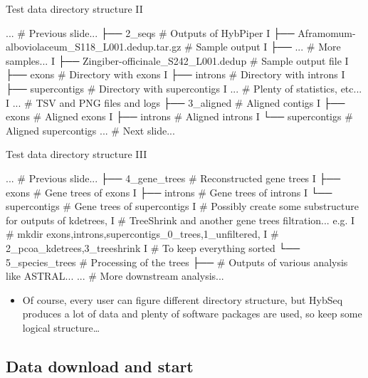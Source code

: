 \documentclass[compress,  xelatex, 11pt, xcolor=x11names, aspectratio=169,
	hyperref={
		bookmarks=true,
		unicode=true,
		colorlinks=true,
		pdftitle={HybSeq course},
		plainpages=false,
		pdfauthor={Vojtech Zeisek},
		pdfsubject={Practical processing of HybSeq target enrichment sequencing data on computing grids like MetaCentrum},
		pdfcreator={XeLaTeX},
		pdfkeywords={BASH, command line, GNU, HybSeq, Linux, MetaCentrum, sequencing shell, target enrichment},
		linkcolor=Turquoise4, %
		anchorcolor=DodgerBlue4, %
		citecolor=DodgerBlue4, %
		filecolor=DodgerBlue4, %
		menucolor=Tan4, %
		urlcolor=DarkOliveGreen4 %
		},
	url={hyphens, lowtilde} %
	]{beamer}
\begin{document}
\begin{frame}[fragile]{Test data directory structure II}
	\begin{bashcode}
        ... # Previous slide...
        ├── 2_seqs # Outputs of HybPiper
        I   ├── Aframomum-alboviolaceum_S118_L001.dedup.tar.gz # Sample output
        I   ├── ... # More samples...
        I   ├── Zingiber-officinale_S242_L001.dedup # Sample output file
        I   ├── exons # Directory with exons
        I   ├── introns # Directory with introns
        I   ├── supercontigs # Directory with supercontigs
        I   ... # Plenty of statistics, etc...
        I   ... # TSV and PNG files and logs
        ├── 3_aligned # Aligned contigs
        I   ├── exons # Aligned exons
        I   ├── introns # Aligned introns
        I   └── supercontigs # Aligned supercontigs
        ... # Next slide...
	\end{bashcode}
\end{frame}

\begin{frame}[fragile]{Test data directory structure III}
	\begin{bashcode}
        ... # Previous slide...
        ├── 4_gene_trees # Reconstructed gene trees
        I   ├── exons # Gene trees of exons
        I   ├── introns # Gene trees of introns
        I   └── supercontigs # Gene trees of supercontigs
        I   # Possibly create some substructure for outputs of kdetrees,
        I   # TreeShrink and another gene trees filtration... e.g.
        I   # mkdir {exons,introns,supercontigs}_{0_trees,1_unfiltered,
        I   #   2_pcoa_kdetrees,3_treeshrink}
        I   # To keep everything sorted
        └── 5_species_trees # Processing of the trees
            ├── # Outputs of various analysis like ASTRAL...
            ... # More downstream analysis...
	\end{bashcode}
	\begin{itemize}
		\item Of course, every user can figure different directory structure, but HybSeq produces a lot of data and plenty of software packages are used, so keep some logical structure\ldots
	\end{itemize}
\end{frame}

\subsection{Data download and start}
\end{document}
